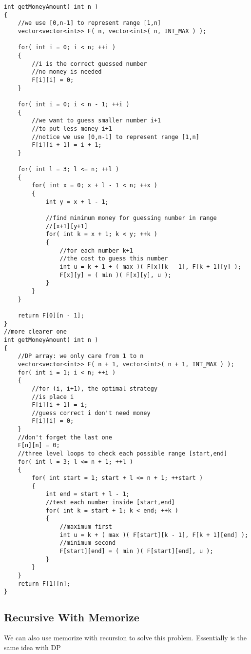 \setcounter{lstlisting}{0}
\begin{lstlisting}[style=customc, caption={Dynamic Programming}]
int getMoneyAmount( int n )
{
    //we use [0,n-1] to represent range [1,n]
    vector<vector<int>> F( n, vector<int>( n, INT_MAX ) );

    for( int i = 0; i < n; ++i )
    {
        //i is the correct guessed number
        //no money is needed
        F[i][i] = 0;
    }

    for( int i = 0; i < n - 1; ++i )
    {
        //we want to guess smaller number i+1
        //to put less money i+1
        //notice we use [0,n-1] to represent range [1,n]
        F[i][i + 1] = i + 1;
    }

    for( int l = 3; l <= n; ++l )
    {
        for( int x = 0; x + l - 1 < n; ++x )
        {
            int y = x + l - 1;

            //find minimum money for guessing number in range
            //[x+1][y+1]
            for( int k = x + 1; k < y; ++k )
            {
                //for each number k+1
                //the cost to guess this number
                int u = k + 1 + ( max )( F[x][k - 1], F[k + 1][y] );
                F[x][y] = ( min )( F[x][y], u );
            }
        }
    }

    return F[0][n - 1];
}
//more clearer one
int getMoneyAmount( int n )
{
    //DP array: we only care from 1 to n
    vector<vector<int>> F( n + 1, vector<int>( n + 1, INT_MAX ) );
    for( int i = 1; i < n; ++i )
    {
        //for (i, i+1), the optimal strategy
        //is place i
        F[i][i + 1] = i;
        //guess correct i don't need money
        F[i][i] = 0;
    }
    //don't forget the last one
    F[n][n] = 0;
    //three level loops to check each possible range [start,end]
    for( int l = 3; l <= n + 1; ++l )
    {
        for( int start = 1; start + l <= n + 1; ++start )
        {
            int end = start + l - 1;
            //test each number inside [start,end]
            for( int k = start + 1; k < end; ++k )
            {
                //maximum first
                int u = k + ( max )( F[start][k - 1], F[k + 1][end] );
                //minimum second
                F[start][end] = ( min )( F[start][end], u );
            }
        }
    }
    return F[1][n];
}
\end{lstlisting}

\subsection{Recursive With Memorize}
We can also use memorize with recursion to solve this problem. Essentially is the same idea with DP

